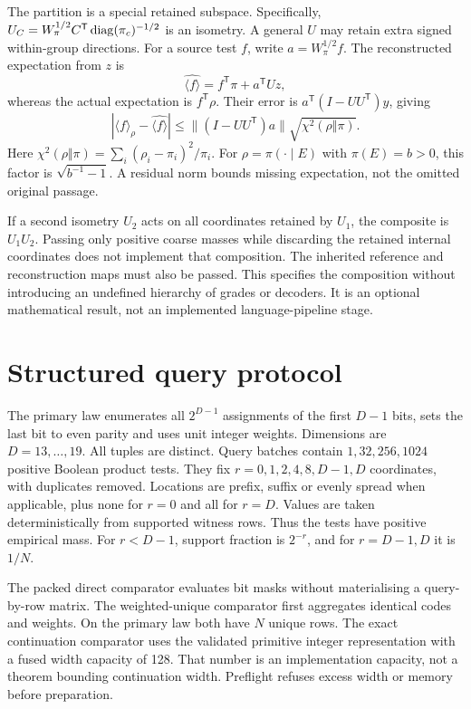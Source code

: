 The partition is a special retained subspace.
Specifically,
\(U_C=W_\pi^{1/2}C^{\mathsf T}\operatorname{diag}(\pi_c)^{-1/2}\)
is an isometry.
A general \(U\) may retain extra signed within-group directions.
For a source test \(f\), write \(a=W_\pi^{1/2}f\).
The reconstructed expectation from \(z\) is
\begin{equation}
 \widehat{\langle f\rangle}
     =f^{\mathsf T}\pi+a^{\mathsf T}Uz ,
\end{equation}
whereas the actual expectation is \(f^{\mathsf T}\rho\).
Their error is
\(a^{\mathsf T}(I-UU^{\mathsf T})y\), giving
\begin{equation}
 \left|\langle f\rangle_\rho-\widehat{\langle f\rangle}\right|
 \leq\|(I-UU^{\mathsf T})a\|
              \sqrt{\chi^2(\rho\Vert\pi)} .
\end{equation}
Here \(\chi^2(\rho\Vert\pi)=\sum_i(\rho_i-\pi_i)^2/\pi_i\).
For \(\rho=\pi(\cdot\mid E)\) with \(\pi(E)=b>0\), this factor is \(\sqrt{b^{-1}-1}\).
A residual norm bounds missing expectation, not the omitted original passage.

If a second isometry \(U_2\) acts on all coordinates retained by \(U_1\), the composite is \(U_1U_2\).
Passing only positive coarse masses while discarding the retained internal coordinates does not implement that composition.
The inherited reference and reconstruction maps must also be passed.
This specifies the composition without introducing an undefined hierarchy of grades or decoders.
It is an optional mathematical result, not an implemented language-pipeline stage.

\section{Structured query protocol}
\label{app:dm-timings}
The primary law enumerates all \(2^{D-1}\) assignments of the first \(D-1\) bits, sets the last bit to even parity and uses unit integer weights.
Dimensions are \(D=13,\ldots,19\).
All tuples are distinct.
Query batches contain \(1,32,256,1024\) positive Boolean product tests.
They fix \(r=0,1,2,4,8,D-1,D\) coordinates, with duplicates removed.
Locations are prefix, suffix or evenly spread when applicable, plus none for \(r=0\) and all for \(r=D\).
Values are taken deterministically from supported witness rows.
Thus the tests have positive empirical mass.
For \(r<D-1\), support fraction is \(2^{-r}\), and for \(r=D-1,D\) it is \(1/N\).

The packed direct comparator evaluates bit masks without materialising a query-by-row matrix.
The weighted-unique comparator first aggregates identical codes and weights.
On the primary law both have \(N\) unique rows.
The exact continuation comparator uses the validated primitive integer representation with a fused width capacity of 128.
That number is an implementation capacity, not a theorem bounding continuation width.
Preflight refuses excess width or memory before preparation.


